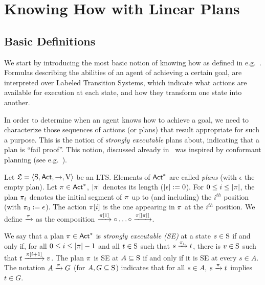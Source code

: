 \section{Knowing How with Linear Plans}
\label{sec:khlinearplans}

\subsection{Basic Definitions}

We start by introducing the most basic notion of knowing how as defined in e.g.~\cite{Wang15lori,Wang16,Wang2016}. Formulas describing the abilities of an agent of achieving a certain goal, are interpreted over Labeled Transition Systems, which indicate what actions are available for execution at each state, and how they transform one state into another.

In order to determine when an agent knows how to achieve a goal, we need to characterize those sequences of actions (or plans) that result appropriate for such a purpose. This is the notion of \emph{strongly executable} plans about, indicating that a plan is ``fail proof''. This notion, discussed already in~\cite{Wang15lori,Wang16,Wang2016} was inspired by conformant planning (see e.g.~\cite{Smith&Weld98,Bonet2010}).

\begin{definition}\label{def:plans}
    Let $\model=\tup{\S,\Act,\ra,\V}$ be an LTS. 
    Elements of $\Act^*$ are called \emph{plans} (with $\epsilon$ the empty plan).  Let $\plan\in\Act^*$, $\size{\plan}$ denotes its length ($\size{\epsilon}:=0$).
    For  $0\leq i \leq \size{\plan}$, the plan $\plan_i$ denotes the initial segment of $\plan$ up to (and including) the $i^{th}$ position (with $\plan_0 := \epsilon$). The action $\plan[i]$ is the one appearing in $\plan$ at the $i^{th}$ position. We define $\reach{\plan}$ as the composition $\reach{\plan[1]} \comp \ldots \comp \reach{\plan[\size{\plan}]}$. 

    We say that a plan $\plan\in\Act^*$ is \emph{strongly executable (SE)} at a state $s\in\S$ if and only if, for all $0\leq i \leq \size{\plan}-1$ and all $t\in\S$ such that $s\reach{\plan_i} t$, there is $v\in\S$ such that $t\reach{\plan[i+1]} v$. The plan $\plan$ is SE at $A\subseteq \S$ if and only if it is SE at every $s\in A$. The notation $A \reach{\plan} G$ (for $A,G\subseteq\S$) indicates that for all $s\in A$,  $s\reach{\plan} t$ implies $t\in G$.
\end{definition}


